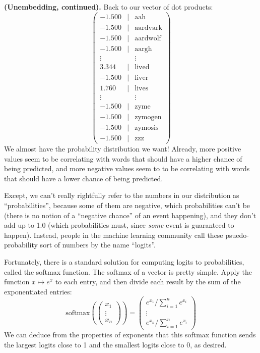 \documentclass{article}
\begin{document}
\textbf{(Unembedding, continued).} Back to our vector of dot products:
$$
\begin{pmatrix}
    -1.500 & | & \text{aah} \\
    -1.500 & | & \text{aardvark} \\
    -1.500 & | & \text{aardwolf} \\
    -1.500 & | & \text{aargh} \\
    \vdots &   & \vdots \\
     3.344 & | & \text{lived} \\
    -1.500 & | & \text{liver} \\
     1.760 & | & \text{lives} \\
    \vdots &   & \vdots \\
    -1.500 & | & \text{zyme} \\
    -1.500 & | & \text{zymogen} \\
    -1.500 & | & \text{zymosis} \\
    -1.500 & | & \text{zzz}
\end{pmatrix}
$$
We almost have the probability distribution we want! Already, more positive values seem to be correlating with words that should have a higher chance of being predicted, and more negative values seem to to be correlating with words that should have a lower chance of being predicted.

Except, we can't really rightfully refer to the numbers in our distribution as ``probabilities'', because some of them are negative, which probabilities can't be (there is no notion of a ``negative chance'' of an event happening), and they don't add up to 1.0 (which probabilities must, since \textit{some} event is guaranteed to happen). Instead, people in the machine learning community call these psuedo-probability sort of numbers by the name ``logits''.

Fortunately, there is a standard solution for computing logits to probabilities, called the softmax function. The softmax of a vector is pretty simple. Apply the function $x \mapsto e^x$ to each entry, and then divide each result by the sum of the exponentiated entries:
$$
\text{softmax} \left( \begin{pmatrix} x_1 \\ \vdots \\ x_n \end{pmatrix} \right)
=
\begin{pmatrix} e^{x_1}/\sum_{i = 1}^n e^{x_i} \\ \vdots \\ e^{x_n}/\sum_{i = 1}^n e^{x_i} \end{pmatrix}
$$
We can deduce from the properties of exponents that this softmax function sends the largest logits close to 1 and the smallest logits close to 0, as desired.
\end{document}
